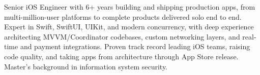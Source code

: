 Senior iOS Engineer with 6+ years building and shipping production apps, from multi-million-user platforms to complete products delivered solo end to end. Expert in Swift, SwiftUI, UIKit, and modern concurrency, with deep experience architecting MVVM/Coordinator codebases, custom networking layers, and real-time and payment integrations. Proven track record leading iOS teams, raising code quality, and taking apps from architecture through App Store release. Master's background in information system security.
